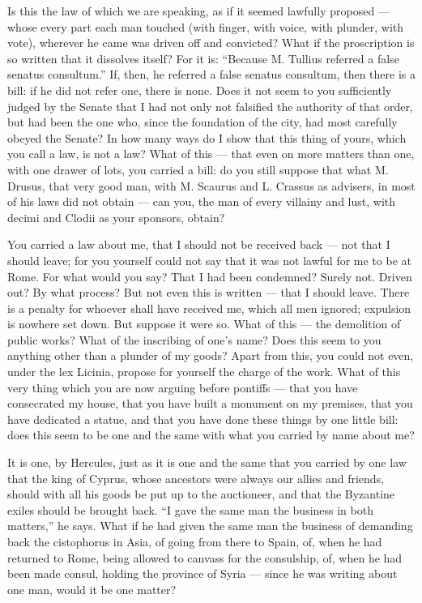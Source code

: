  Is this the law of which we are speaking, as if it seemed lawfully proposed --- whose every part each man touched (with finger, with voice, with plunder, with vote), wherever he came was driven off and convicted? What if the proscription is so written that it dissolves itself? For it is: ``Because M. Tullius referred a false senatus consultum.'' If, then, he referred a false senatus consultum, then there is a bill: if he did not refer one, there is none. Does it not seem to you sufficiently judged by the Senate that I had not only not falsified the authority of that order, but had been the one who, since the foundation of the city, had most carefully obeyed the Senate? In how many ways do I show that this thing of yours, which you call a law, is not a law? What of this --- that even on more matters than one, with one drawer of lots, you carried a bill: do you still suppose that what M. Drusus, that very good man, with M. Scaurus and L. Crassus as advisers, in most of his laws did not obtain --- can you, the man of every villainy and lust, with decimi and Clodii as your sponsors, obtain?

 You carried a law about me, that I should not be received back --- not that I should leave; for you yourself could not say that it was not lawful for me to be at Rome. For what would you say? That I had been condemned? Surely not. Driven out? By what process? But not even this is written --- that I should leave. There is a penalty for whoever shall have received me, which all men ignored; expulsion is nowhere set down. But suppose it were so. What of this --- the demolition of public works? What of the inscribing of one's name? Does this seem to you anything other than a plunder of my goods? Apart from this, you could not even, under the lex Licinia, propose for yourself the charge of the work. What of this very thing which you are now arguing before pontiffs --- that you have consecrated my house, that you have built a monument on my premises, that you have dedicated a statue, and that you have done these things by one little bill: does this seem to be one and the same with what you carried by name about me?

 It is one, by Hercules, just as it is one and the same that you carried by one law that the king of Cyprus, whose ancestors were always our allies and friends, should with all his goods be put up to the auctioneer, and that the Byzantine exiles should be brought back. ``I gave the same man the business in both matters,'' he says. What if he had given the same man the business of demanding back the cistophorus in Asia, of going from there to Spain, of, when he had returned to Rome, being allowed to canvass for the consulship, of, when he had been made consul, holding the province of Syria --- since he was writing about one man, would it be one matter?

